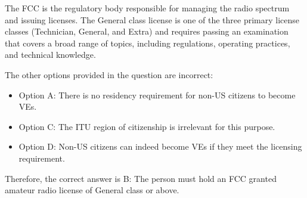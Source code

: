 The FCC is the regulatory body responsible for managing the radio spectrum and issuing licenses. The General class license is one of the three primary license classes (Technician, General, and Extra) and requires passing an examination that covers a broad range of topics, including regulations, operating practices, and technical knowledge.

The other options provided in the question are incorrect:
\begin{itemize}
    \item Option A: There is no residency requirement for non-US citizens to become VEs.
    \item Option C: The ITU region of citizenship is irrelevant for this purpose.
    \item Option D: Non-US citizens can indeed become VEs if they meet the licensing requirement.
\end{itemize}

Therefore, the correct answer is B: The person must hold an FCC granted amateur radio license of General class or above.

